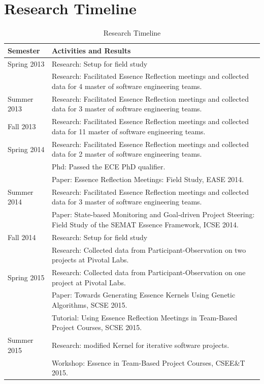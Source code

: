\documentclass[preprint,12pt,3p]{elsarticle}
\begin{document}
\appendix
\section{Research Timeline}
\label{appendix}

\begin{table}[H]
\caption{Research Timeline}
\label{ResearchTimeline}
\centering
\begin{tabular}{|p{1.00in}|p{5.00in}|}
\hline
Semester    & Activities and Results  \\ \hline
Spring 2013 & Research: Setup for field study \\
            & Research: Facilitated Essence Reflection meetings and collected data for 4 master of software engineering teams. \\ \hline
Summer 2013 & Research: Facilitated Essence Reflection meetings and collected data for 3 master of software engineering teams.  \\ \hline
Fall 2013   & Research: Facilitated Essence Reflection meetings and collected data for 11 master of software engineering teams.  \\ \hline
Spring 2014 & Research: Facilitated Essence Reflection meetings and collected data for 2 master of software engineering teams.\\ 
            & Phd: Passed the ECE PhD qualifier.\\ 
            & Paper: Essence Reflection Meetings: Field Study, EASE 2014. \cite{EASE2014} \\ \hline
Summer 2014 & Research: Facilitated Essence Reflection meetings and collected data for 3 master of software engineering teams.\\ 
            & Paper: State-based Monitoring and Goal-driven Project Steering: Field Study of the SEMAT Essence Framework, ICSE 2014. \cite{ICSE2014} \\ \hline
Fall 2014   & Research: Setup for field study \\
            & Research: Collected data from Participant-Observation on two projects at Pivotal Labs.  \\ \hline
Spring 2015 & Research: Collected data from Participant-Observation on one project at Pivotal Labs.\\ 
            & Paper: Towards Generating Essence Kernels Using Genetic Algorithms, SCSE 2015. \cite{SCSE2015} \\ 
            & Tutorial: Using Essence Reflection Meetings in Team-Based Project Courses, SCSE 2015.\cite{SCSE2015Tutorial} \\ \hline
Summer 2015 & Research: modified Kernel for iterative software projects.\\ 
            & Workshop: Essence in Team-Based Project Courses, CSEE\&T 2015. \cite{CSEET2015Workshop} \\ \hline                     
\end{tabular}
\end{table}
\end{document}
